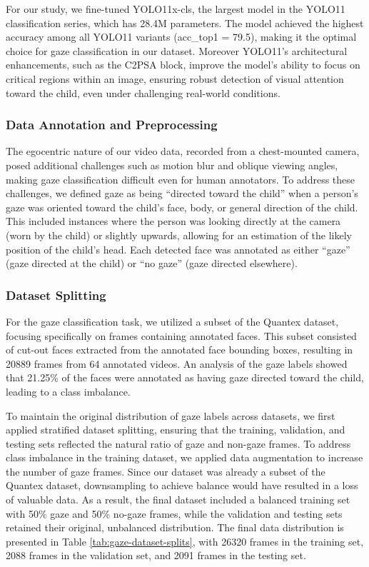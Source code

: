 \documentclass[
  man,floatsintext]{apa6}
\begin{document}
For our study, we fine-tuned YOLO11x-cls, the largest model in the YOLO11 classification series, which has 28.4M parameters. The model achieved the highest accuracy among all YOLO11 variants (acc\_top1 = 79.5), making it the optimal choice for gaze classification in our dataset. Moreover YOLO11's architectural enhancements, such as the C2PSA block, improve the model's ability to focus on critical regions within an image, ensuring robust detection of visual attention toward the child, even under challenging real-world conditions.

\subsubsection{Data Annotation and Preprocessing}\label{data-annotation-and-preprocessing}

The egocentric nature of our video data, recorded from a chest-mounted camera, posed additional challenges such as motion blur and oblique viewing angles, making gaze classification difficult even for human annotators. To address these challenges, we defined gaze as being ``directed toward the child'' when a person's gaze was oriented toward the child's face, body, or general direction of the child. This included instances where the person was looking directly at the camera (worn by the child) or slightly upwards, allowing for an estimation of the likely position of the child's head. Each detected face was annotated as either ``gaze'' (gaze directed at the child) or ``no gaze'' (gaze directed elsewhere).

\subsubsection{Dataset Splitting}\label{dataset-splitting-1}

For the gaze classification task, we utilized a subset of the Quantex dataset, focusing specifically on frames containing annotated faces. This subset consisted of cut-out faces extracted from the annotated face bounding boxes, resulting in 20889 frames from 64 annotated videos. An analysis of the gaze labels showed that 21.25\% of the faces were annotated as having gaze directed toward the child, leading to a class imbalance.

To maintain the original distribution of gaze labels across datasets, we first applied stratified dataset splitting, ensuring that the training, validation, and testing sets reflected the natural ratio of gaze and non-gaze frames. To address class imbalance in the training dataset, we applied data augmentation to increase the number of gaze frames. Since our dataset was already a subset of the Quantex dataset, downsampling to achieve balance would have resulted in a loss of valuable data. As a result, the final dataset included a balanced training set with 50\% gaze and 50\% no-gaze frames, while the validation and testing sets retained their original, unbalanced distribution. The final data distribution is presented in Table \ref{tab:gaze-dataset-splits}, with 26320 frames in the training set, 2088 frames in the validation set, and 2091 frames in the testing set.
\end{document}
